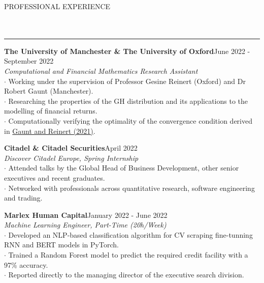 \documentclass[11pt]{article}
\begin{document}
\vspace{-0.3em}

{\large PROFESSIONAL EXPERIENCE}\\
\vspace{-1.5em}\\

\vspace{-1.5em}\\
\noindent\rule{\textwidth}{0.1pt}

\hspace{}

\vspace{-0.7em}

\textbf{The University of Manchester \& The University of Oxford}\hspace*{\fill}June 2022 - September 2022\\
\emph{Computational and Financial Mathematics Research Assistant}\smallskip\\
$\cdot$ Working under the supervision of Professor Gesine Reinert (Oxford) and Dr Robert Gaunt (Manchester).\\
$\cdot$ Researching the properties of the GH distribution and its applications to the modelling of financial returns.\\
$\cdot$ Computationally verifying the optimality of the convergence condition derived in \href{https://arxiv.org/pdf/2111.00949.pdf}{Gaunt and Reinert (2021)}.\\

\vspace{-0.6em}

\textbf{Citadel \& Citadel Securities}\hspace*{\fill}April 2022\\
\emph{Discover Citadel Europe, Spring Internship}\smallskip\\
$\cdot$ Attended talks by the Global Head of Business Development, other senior executives and recent graduates.\\
$\cdot$ Networked with professionals across quantitative research, software engineering and trading.\\

\vspace{-0.6em}

\textbf{Marlex Human Capital}\hspace*{\fill}January 2022 - June 2022\\
\emph{Machine Learning Engineer, Part-Time (20h/Week)}\smallskip\\
$\cdot$ Developed an NLP-based classification algorithm for CV scraping fine-tunning RNN and BERT models in PyTorch.\\
$\cdot$ Trained a Random Forest model to predict the required credit facility with a 97\% accuracy.\\
$\cdot$ Reported directly to the managing director of the executive search division.\\
\end{document}
